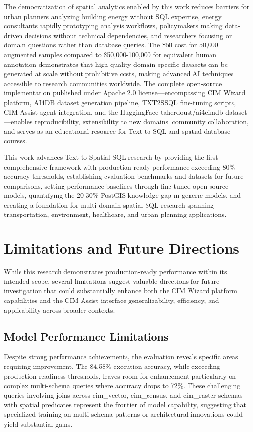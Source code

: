 The democratization of spatial analytics enabled by this work reduces barriers for urban planners analyzing building energy without SQL expertise, energy consultants rapidly prototyping analysis workflows, policymakers making data-driven decisions without technical dependencies, and researchers focusing on domain questions rather than database queries. The \$50 cost for 50,000 augmented samples compared to \$50,000-100,000 for equivalent human annotation demonstrates that high-quality domain-specific datasets can be generated at scale without prohibitive costs, making advanced AI techniques accessible to research communities worldwide. The complete open-source implementation published under Apache 2.0 license---encompassing CIM Wizard platform, AI4DB dataset generation pipeline, TXT2SSQL fine-tuning scripts, CIM Assist agent integration, and the HuggingFace taherdoust/ai4cimdb dataset---enables reproducibility, extensibility to new domains, community collaboration, and serves as an educational resource for Text-to-SQL and spatial database courses.

This work advances Text-to-Spatial-SQL research by providing the first comprehensive framework with production-ready performance exceeding 80\% accuracy thresholds, establishing evaluation benchmarks and datasets for future comparisons, setting performance baselines through fine-tuned open-source models, quantifying the 20-30\% PostGIS knowledge gap in generic models, and creating a foundation for multi-domain spatial SQL research spanning transportation, environment, healthcare, and urban planning applications.

\section{Limitations and Future Directions}

While this research demonstrates production-ready performance within its intended scope, several limitations suggest valuable directions for future investigation that could substantially enhance both the CIM Wizard platform capabilities and the CIM Assist interface generalizability, efficiency, and applicability across broader contexts.

\subsection{Model Performance Limitations}

Despite strong performance achievements, the evaluation reveals specific areas requiring improvement. The 84.58\% execution accuracy, while exceeding production readiness thresholds, leaves room for enhancement particularly on complex multi-schema queries where accuracy drops to 72\%. These challenging queries involving joins across cim\_vector, cim\_census, and cim\_raster schemas with spatial predicates represent the frontier of model capability, suggesting that specialized training on multi-schema patterns or architectural innovations could yield substantial gains.

